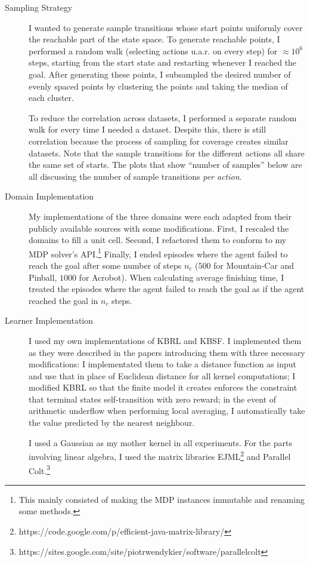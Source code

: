 \begin{description}

\item[Sampling Strategy]
I wanted to generate sample transitions whose start points 
uniformly cover the reachable part of the state space.
To generate reachable points,
I performed a random walk (selecting actions u.a.r. on every step) for $\approx10^6$
steps, starting from the start state and restarting whenever I reached the goal.
After generating these points, I subsampled the desired number of evenly spaced
points by clustering the points and taking the median of each cluster.

To reduce the correlation across datasets, I performed a separate random walk
for every time I needed a dataset.
Despite this, there is still correlation because the process of sampling for
coverage creates similar datasets.
Note that the sample transitions for the different actions all share the same set of
starts.
The plots that show ``number of samples'' below are all discussing the
number of sample transitions \textit{per action}.

\item[Domain Implementation]
My implementations of the three domains were each adapted from their
publicly available sources with some modifications.
First, I rescaled the domains to fill a unit cell.
Second, I refactored them to conform to my MDP solver's API.\footnote{
This mainly consisted of making the MDP instances immutable and renaming some
methods.}
Finally, I ended episodes where the agent failed to reach the goal after some 
number of steps $n_c$ ($500$ for Mountain-Car and Pinball, $1000$ for Acrobot).
When calculating average finishing time,
I treated the episodes where the agent failed to reach the goal as if the agent
reached the goal in $n_c$ steps.

\item[Learner Implementation]
I used my own implementations of KBRL and KBSF.
I implemented them as they were described in the papers introducing them
with three necessary modifications:
I implementated them to take a distance function as input and use that in
place of Euclidean distance for all kernel computations;
I modified KBRL so that the finite model it creates enforces the constraint
that terminal states self-transition with zero reward;
in the event of arithmetic underflow when performing local averaging,
I automatically take the value predicted by the nearest neighbour.

I used a Gaussian as my mother kernel in all experiments.
For the parts involving linear algebra, I used the matrix libraries
EJML\footnote{https://code.google.com/p/efficient-java-matrix-library/} and
Parallel Colt.\footnote{
https://sites.google.com/site/piotrwendykier/software/parallelcolt}


\end{description}
